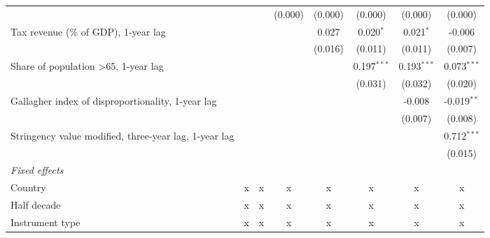 \begin{tabular}{lccccccc}
                                                                            &                &                & (0.000)        & (0.000)       & (0.000)       & (0.000)       & (0.000)\\   
   Tax revenue (\% of GDP), 1-year lag                                      &                &                &                & 0.027         & 0.020$^{*}$   & 0.021$^{*}$   & -0.006\\   
                                                                            &                &                &                & (0.016)       & (0.011)       & (0.011)       & (0.007)\\   
   Share of population >65, 1-year lag                                      &                &                &                &               & 0.197$^{***}$ & 0.193$^{***}$ & 0.073$^{***}$\\   
                                                                            &                &                &                &               & (0.031)       & (0.032)       & (0.020)\\   
   Gallagher index of disproportionality, 1-year lag                        &                &                &                &               &               & -0.008        & -0.019$^{**}$\\   
                                                                            &                &                &                &               &               & (0.007)       & (0.008)\\   
   Stringency value modified, three-year lag, 1-year lag                    &                &                &                &               &               &               & 0.712$^{***}$\\   
                                                                            &                &                &                &               &               &               & (0.015)\\   
   \emph{Fixed effects}\\
   Country                                                                  & x              & x              & x              & x             & x             & x             & x\\  
   Half decade                                                              & x              & x              & x              & x             & x             & x             & x\\  
   Instrument type                                                          & x              & x              & x              & x             & x             & x             & x\\  

\end{tabular}
